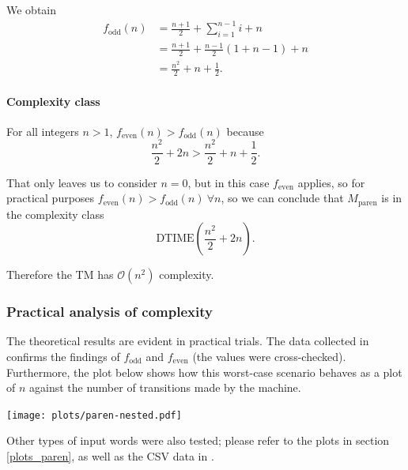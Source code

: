 We obtain
\begin{align*} 
    f_{\text{odd}}(n)
    &= \frac{n+1}{2} + \sum_{i=1}^{n-1}{i} + n\\
    &= \frac{n+1}{2} + \frac{n-1}{2} \left( 1+n-1 \right) + n \\
    &= \frac{n^2}{2} + n + \frac{1}{2}.
\end{align*}


\paragraph{Complexity class}
For all integers $n>1$, $f_{\text{even}}(n) > f_{\text{odd}}(n)$ because
$$
\frac{n^2}{2} + 2n
>
\frac{n^2}{2} + n + \frac{1}{2}.
$$

That only leaves us to consider $n=0$, but in this case $f_{\text{even}}$ applies, so for practical purposes $f_\text{even}(n)>f_\text{odd}(n) \ \forall n$, so we can conclude that $M_\text{paren}$ is in the complexity class
$$
    \text{DTIME}\left( \frac{n^2}{2} + 2n \right).
$$

Therefore the TM has $\mathcal{O}(n^2)$ complexity.

\subsubsection{Practical analysis of complexity}

The theoretical results are evident in practical trials. The data collected in  confirms the findings of $f_\text{odd}$ and $f_\text{even}$ (the values were cross-checked). Furthermore, the plot below shows how this worst-case scenario behaves as a plot of $n$ against the number of transitions made by the machine. 

\begin{center}
    \texttt{[image: plots/paren-nested.pdf]}
\end{center}

Other types of input words were also tested; please refer to the plots in section \ref{plots_paren}, as well as the CSV data in . 